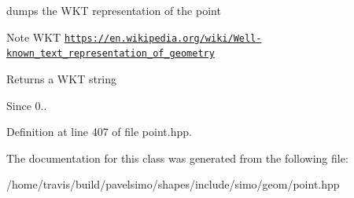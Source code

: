 dumps the W\-K\-T representation of the point 

\begin{DoxyNote}{Note}
W\-K\-T \href{https://en.wikipedia.org/wiki/Well-known_text_representation_of_geometry}{\tt https\-://en.\-wikipedia.\-org/wiki/\-Well-\/known\-\_\-text\-\_\-representation\-\_\-of\-\_\-geometry}
\end{DoxyNote}
\begin{DoxyReturn}{Returns}
a W\-K\-T string
\end{DoxyReturn}
\begin{DoxySince}{Since}
0.. 
\end{DoxySince}


Definition at line 407 of file point.\-hpp.



The documentation for this class was generated from the following file\-:\begin{DoxyCompactItemize}
\item 
/home/travis/build/pavelsimo/shapes/include/simo/geom/point.\-hpp\end{DoxyCompactItemize}
